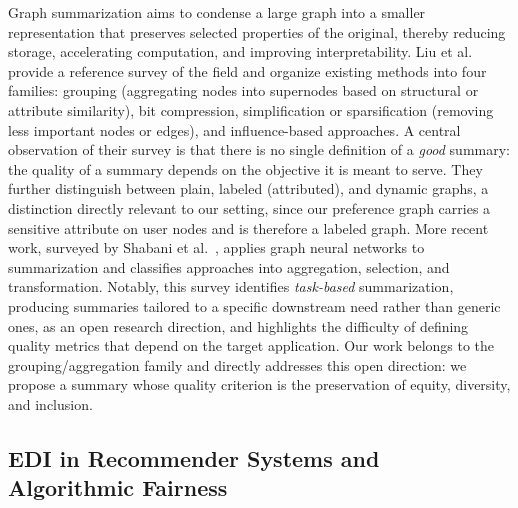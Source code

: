 \documentclass[runningheads]{llncs}
\begin{document}
Graph summarization aims to condense a large graph into a smaller
representation that preserves selected properties of the original, thereby
reducing storage, accelerating computation, and improving interpretability.
Liu et al.~\cite{liu_graph_2018} provide a reference survey of the field and
organize existing methods into four families: grouping (aggregating nodes
into supernodes based on structural or attribute similarity), bit compression,
simplification or sparsification (removing less important nodes or edges), and
influence-based approaches. A central observation of their survey is that
there is no single definition of a \emph{good} summary: the quality of a
summary depends on the objective it is meant to serve. They further
distinguish between plain, labeled (attributed), and dynamic graphs, a
distinction directly relevant to our setting, since our preference graph
carries a sensitive attribute on user nodes and is therefore a labeled graph.
More recent work, surveyed by Shabani et
al.~\cite{shabani_comprehensive_2024}, applies graph neural networks to
summarization and classifies approaches into aggregation, selection, and
transformation. Notably, this survey identifies \emph{task-based}
summarization, producing summaries tailored to a specific downstream need
rather than generic ones, as an open research direction, and highlights the
difficulty of defining quality metrics that depend on the target application.
Our work belongs to the grouping/aggregation family and directly addresses
this open direction: we propose a summary whose quality criterion is the
preservation of equity, diversity, and inclusion.

\subsection{EDI in Recommender Systems and Algorithmic Fairness}
\end{document}
